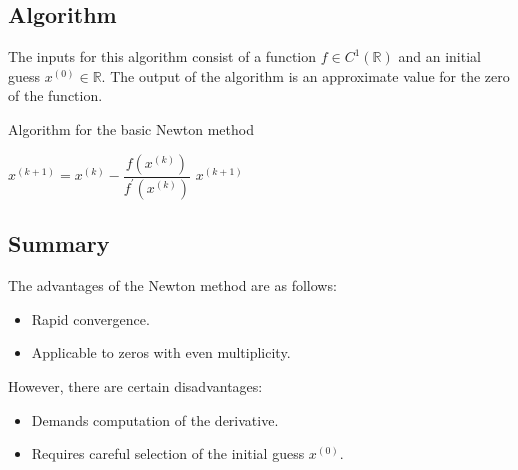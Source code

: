 \subsection*{Algorithm}
The inputs for this algorithm consist of a function $f \in C^1(\mathbb{R})$ and an initial guess $x^{(0)} \in \mathbb{R}$. 
The output of the algorithm is an approximate value for the zero of the function.
\begin{algorithm}[H]
    \caption{Algorithm for the basic Newton method}
        \begin{algorithmic}[1]
                \State $x^{(k+1)}=x^{(k)}-\dfrac{f(x^{(k)})}{f^{'}(x^{(k)})}$
                    \State \Return $x^{(k+1)}$
                \EndIf
            \EndFor
        \end{algorithmic}
\end{algorithm}

\subsection*{Summary}
The advantages of the Newton method are as follows:
\begin{itemize}
    \item Rapid convergence. 
    \item Applicable to zeros with even multiplicity.
\end{itemize}
However, there are certain disadvantages:
\begin{itemize}
    \item Demands computation of the derivative.
    \item Requires careful selection of the initial guess $x^{(0)}$. 
\end{itemize}
